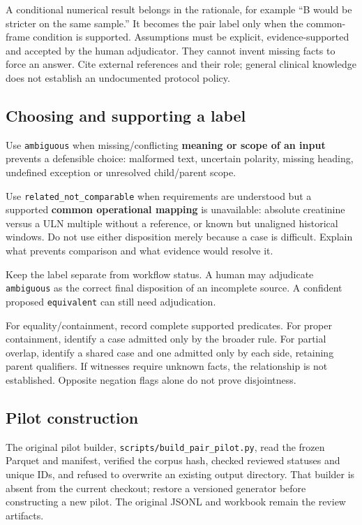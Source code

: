 \documentclass[10pt,letterpaper]{article}
\newcommand{\pathcode}[1]{\nolinkurl{#1}}
\begin{document}
A conditional numerical result belongs in the rationale, for example ``B would be stricter on the same sample.'' It becomes the pair label only when the common-frame condition is supported. Assumptions must be explicit, evidence-supported and accepted by the human adjudicator. They cannot invent missing facts to force an answer. Cite external references and their role; general clinical knowledge does not establish an undocumented protocol policy.

\subsection{Choosing and supporting a label}\label{contract02-choosing-and-supporting-a-label}

Use \pathcode{ambiguous} when missing/conflicting \textbf{meaning or scope of an input} prevents a defensible choice: malformed text, uncertain polarity, missing heading, undefined exception or unresolved child/parent scope.

Use \pathcode{related_not_comparable} when requirements are understood but a supported \textbf{common operational mapping} is unavailable: absolute creatinine versus a ULN multiple without a reference, or known but unaligned historical windows. Do not use either disposition merely because a case is difficult. Explain what prevents comparison and what evidence would resolve it.

Keep the label separate from workflow status. A human may adjudicate \pathcode{ambiguous} as the correct final disposition of an incomplete source. A confident proposed \pathcode{equivalent} can still need adjudication.

For equality/containment, record complete supported predicates. For proper containment, identify a case admitted only by the broader rule. For partial overlap, identify a shared case and one admitted only by each side, retaining parent qualifiers. If witnesses require unknown facts, the relationship is not established. Opposite negation flags alone do not prove disjointness.

\subsection{Pilot construction}\label{contract02-pilot-construction}

The original pilot builder, \pathcode{scripts/build_pair_pilot.py}, read the frozen Parquet and manifest, verified the corpus hash, checked reviewed statuses and unique IDs, and refused to overwrite an existing output directory. That builder is absent from the current checkout; restore a versioned generator before constructing a new pilot. The original JSONL and workbook remain the review artifacts.
\end{document}
